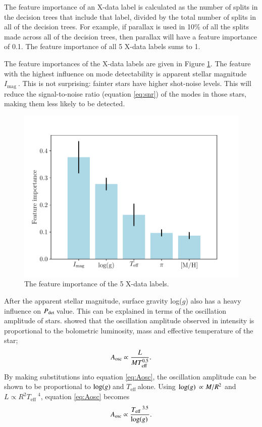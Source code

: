 \documentclass[a4paper,fleqn,usenatbib,useAMS]{mnras}
\newcommand{\teff}{\ensuremath{T_{\textrm{eff}}\:}}
\newcommand{\pdet}{\ensuremath{P_{\rm det}\:}}
\newcommand{\imag}{\ensuremath{I_{\textrm{mag}}\:}}
\newcommand{\logg}{\ensuremath{{\rm log}(g)\:}}
\begin{document}
The feature importance of an X-data label is calculated as the number of splits in the decision trees that include that label, divided by the total number of splits in all of the decision trees. For example, if parallax is used in 10\% of all the splits made across all of the decision trees, then parallax will have a feature importance of 0.1. The feature importance of all 5 X-data labels sums to 1.

The feature importances of the X-data labels are given in Figure \ref{fig:feature}. The feature with the highest influence on mode detectability is apparent stellar magnitude \imag. This is not surprising: fainter stars have higher shot-noise levels. This will reduce the signal-to-noise ratio (equation \ref{eq:snr}) of the modes in those stars, making them less likely to be detected.
\begin{figure}
	\centering
	\includegraphics[scale=0.5]{Plot1_featureimportance.pdf}
	\caption{The feature importance of the 5 X-data labels.}	
	\label{fig:feature}
\end{figure}

After the apparent stellar magnitude, surface gravity log($g$) also has a heavy influence on \pdet value. This can be explained in terms of the oscillation amplitude of stars. \citet{kjeldsen_amplitudes_1995} showed that the oscillation amplitude observed in intensity is proportional to the bolometric luminosity, mass and effective temperature of the star;
\begin{equation}
A_{\rm osc} \propto \frac{L}{MT_{\rm eff}^{0.5}}.
\label{eq:Aosc}
\end{equation}
By making substitutions into equation \ref{eq:Aosc}, the oscillation amplitude can be shown to be proportional to \logg and \teff alone. Using $\logg \propto M/R^{2}$ and $L \propto R^{2}\teff^{4}$, equation \ref{eq:Aosc} becomes
\begin{equation}
A_{\rm osc} \propto \frac{\teff^{3.5}}{\logg} .
\end{equation}
\end{document}
